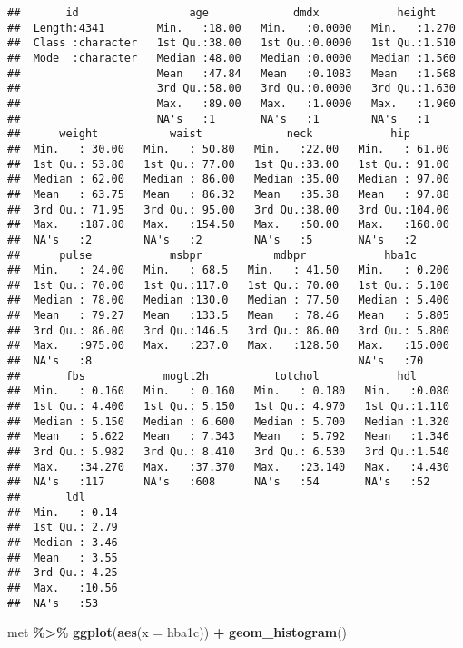 \documentclass[
]{article}
\newenvironment{Shaded}{\begin{snugshade}}{\end{snugshade}}
\newcommand{\AttributeTok}[1]{\textcolor[rgb]{0.13,0.29,0.53}{#1}}
\newcommand{\FunctionTok}[1]{\textcolor[rgb]{0.13,0.29,0.53}{\textbf{#1}}}
\newcommand{\NormalTok}[1]{#1}
\newcommand{\SpecialCharTok}[1]{\textcolor[rgb]{0.81,0.36,0.00}{\textbf{#1}}}
\begin{document}
\begin{verbatim}
##       id                 age             dmdx            height     
##  Length:4341        Min.   :18.00   Min.   :0.0000   Min.   :1.270  
##  Class :character   1st Qu.:38.00   1st Qu.:0.0000   1st Qu.:1.510  
##  Mode  :character   Median :48.00   Median :0.0000   Median :1.560  
##                     Mean   :47.84   Mean   :0.1083   Mean   :1.568  
##                     3rd Qu.:58.00   3rd Qu.:0.0000   3rd Qu.:1.630  
##                     Max.   :89.00   Max.   :1.0000   Max.   :1.960  
##                     NA's   :1       NA's   :1        NA's   :1      
##      weight           waist             neck            hip        
##  Min.   : 30.00   Min.   : 50.80   Min.   :22.00   Min.   : 61.00  
##  1st Qu.: 53.80   1st Qu.: 77.00   1st Qu.:33.00   1st Qu.: 91.00  
##  Median : 62.00   Median : 86.00   Median :35.00   Median : 97.00  
##  Mean   : 63.75   Mean   : 86.32   Mean   :35.38   Mean   : 97.88  
##  3rd Qu.: 71.95   3rd Qu.: 95.00   3rd Qu.:38.00   3rd Qu.:104.00  
##  Max.   :187.80   Max.   :154.50   Max.   :50.00   Max.   :160.00  
##  NA's   :2        NA's   :2        NA's   :5       NA's   :2       
##      pulse            msbpr           mdbpr            hba1c       
##  Min.   : 24.00   Min.   : 68.5   Min.   : 41.50   Min.   : 0.200  
##  1st Qu.: 70.00   1st Qu.:117.0   1st Qu.: 70.00   1st Qu.: 5.100  
##  Median : 78.00   Median :130.0   Median : 77.50   Median : 5.400  
##  Mean   : 79.27   Mean   :133.5   Mean   : 78.46   Mean   : 5.805  
##  3rd Qu.: 86.00   3rd Qu.:146.5   3rd Qu.: 86.00   3rd Qu.: 5.800  
##  Max.   :975.00   Max.   :237.0   Max.   :128.50   Max.   :15.000  
##  NA's   :8                                         NA's   :70      
##       fbs            mogtt2h          totchol            hdl       
##  Min.   : 0.160   Min.   : 0.160   Min.   : 0.180   Min.   :0.080  
##  1st Qu.: 4.400   1st Qu.: 5.150   1st Qu.: 4.970   1st Qu.:1.110  
##  Median : 5.150   Median : 6.600   Median : 5.700   Median :1.320  
##  Mean   : 5.622   Mean   : 7.343   Mean   : 5.792   Mean   :1.346  
##  3rd Qu.: 5.982   3rd Qu.: 8.410   3rd Qu.: 6.530   3rd Qu.:1.540  
##  Max.   :34.270   Max.   :37.370   Max.   :23.140   Max.   :4.430  
##  NA's   :117      NA's   :608      NA's   :54       NA's   :52     
##       ldl       
##  Min.   : 0.14  
##  1st Qu.: 2.79  
##  Median : 3.46  
##  Mean   : 3.55  
##  3rd Qu.: 4.25  
##  Max.   :10.56  
##  NA's   :53
\end{verbatim}

\begin{Shaded}
\begin{Highlighting}[]
\NormalTok{met }\SpecialCharTok{\%\textgreater{}\%} 
  \FunctionTok{ggplot}\NormalTok{(}\FunctionTok{aes}\NormalTok{(}\AttributeTok{x =}\NormalTok{ hba1c)) }\SpecialCharTok{+} 
  \FunctionTok{geom\_histogram}\NormalTok{() }
\end{Highlighting}
\end{Shaded}
\end{document}
